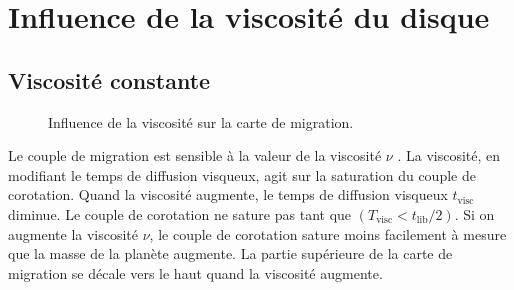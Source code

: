 \section{Influence de la viscosité du disque}
\subsection{Viscosité constante}

\begin{figure}[htb]
\centering
{}
\hfill
{}


\hfill
{}
\caption{Influence de la viscosité sur la carte de migration. }
\end{figure}\label{fig:constant_viscosity}

Le couple de migration est sensible à la valeur de la viscosité $\nu$ . La viscosité, en modifiant le temps de diffusion visqueux, agit sur la saturation du couple de corotation. Quand la viscosité augmente, le temps de diffusion visqueux $t_\text{visc}$ diminue. Le couple de corotation ne sature pas tant que $(T_\text{visc} < t_\text{lib}/2)$. Si on augmente la viscosité $\nu$, le couple de corotation sature moins facilement à mesure que la masse de la planète augmente. La partie supérieure de la carte de migration se décale vers le haut quand la viscosité augmente. 

